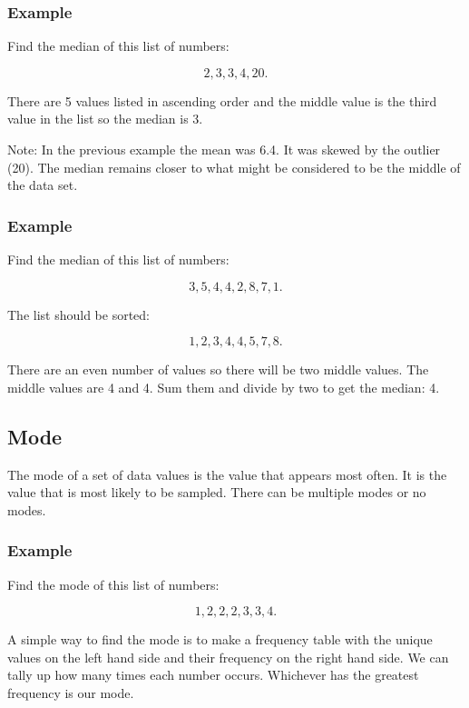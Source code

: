 \documentclass[
]{book}
\begin{document}
\hypertarget{example-1}{%
\subsubsection{Example}\label{example-1}}

Find the median of this list of numbers:

\[ 2, 3, 3, 4, 20.\]

There are 5 values listed in ascending order and the middle value is the third value in the list so the median is 3.

Note: In the previous example the mean was 6.4. It was skewed by the outlier (20). The median remains closer to what might be considered to be the middle of the data set.

\hypertarget{example-2}{%
\subsubsection{Example}\label{example-2}}

Find the median of this list of numbers:

\[ 3, 5, 4, 4, 2, 8, 7, 1.\]

The list should be sorted:

\[ 1, 2, 3, 4, 4, 5, 7, 8. \]

There are an even number of values so there will be two middle values. The middle values are 4 and 4. Sum them and divide by two to get the median: 4.

\hypertarget{mode}{%
\subsection{Mode}\label{mode}}

The mode of a set of data values is the value that appears most often. It is the value that is most likely to be sampled. There can be multiple modes or no modes.

\hypertarget{example-3}{%
\subsubsection{Example}\label{example-3}}

Find the mode of this list of numbers:

\[ 1, 2, 2, 2, 3, 3, 4.\]

A simple way to find the mode is to make a frequency table with the unique values on the left hand side and their frequency on the right hand side. We can tally up how many times each number occurs. Whichever has the greatest frequency is our mode.
\end{document}
